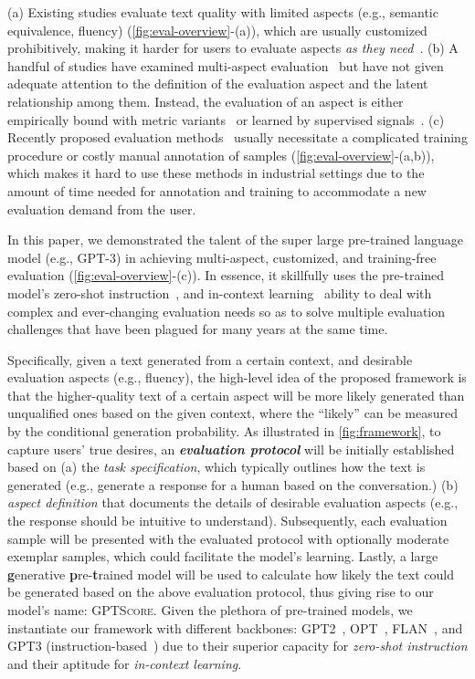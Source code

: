 (a) Existing studies evaluate text quality with limited aspects (e.g., semantic equivalence, fluency) (\autoref{fig:eval-overview}-(a)), which are usually customized prohibitively, making it harder for users to evaluate aspects \textit{as they need}~\cite{freitag:mqm}. (b) A handful of studies have examined multi-aspect evaluation~\cite{bartscore2021yuan,QuestEval,zhong:unifiedEval} but have not given adequate attention to the definition of the evaluation aspect and the latent relationship among them. Instead, the evaluation of an aspect is either empirically bound with metric variants~\cite{bartscore2021yuan} or learned by supervised signals~\cite{zhong:unifiedEval}. (c) Recently proposed evaluation methods~\cite{fed2020shikib,rei:comet,li:flowscore,zhong:unifiedEval} usually necessitate a complicated training procedure or costly manual annotation of samples  (\autoref{fig:eval-overview}-(a,b)), which makes it hard to use these methods in industrial settings due to the amount of time needed for annotation and training to accommodate a new evaluation demand from the user.

In this paper, we demonstrated the talent of the super large pre-trained language model (e.g., GPT-3) in achieving multi-aspect, customized, and training-free evaluation  (\autoref{fig:eval-overview}-(c)). In essence, it skillfully uses the pre-trained model's zero-shot instruction~\cite{chung2022scaling}, and in-context learning~\cite{tom:gpt3,sewon:in-context} ability to deal with complex and ever-changing evaluation needs so as to solve multiple evaluation challenges that have been plagued for many years at the same time.

Specifically, given a text generated from a certain context, and desirable evaluation aspects (e.g., fluency), the high-level idea of the proposed framework is that the higher-quality text of a certain aspect will be more likely generated than unqualified ones based on the given context, where the ``likely'' can be measured by the conditional generation probability. As illustrated in \autoref{fig:framework}, to capture users' true desires, an \textbf{\textit{evaluation protocol}} will be initially established based on (a) the \textit{task specification}, which typically outlines how the text is generated (e.g., generate a response for a human based on the conversation.) (b) \textit{aspect definition} that documents the details of desirable evaluation aspects (e.g., the response should be intuitive to understand). Subsequently, each evaluation sample will be presented with the evaluated protocol with optionally moderate exemplar samples, which could facilitate the model's learning. Lastly, a large \textbf{g}enerative \textbf{p}re-\textbf{t}rained model will be used to calculate how likely the text could be generated based on the above evaluation protocol, thus giving rise to our model's name: \textsc{GPTScore}.
Given the plethora of pre-trained models, we instantiate our framework with different backbones: GPT2~\cite{radford2019language}, OPT~\cite{zhang2022opt}, FLAN~\cite{chung2022scaling}, and GPT3 (instruction-based~\cite{ouyang2022training}) due to their superior capacity for \textit{zero-shot instruction} and their aptitude for \textit{in-context learning}.

